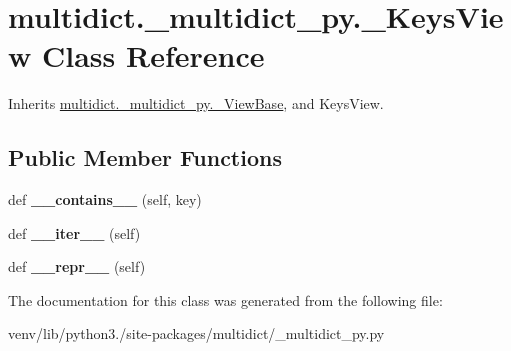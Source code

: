 \hypertarget{classmultidict_1_1__multidict__py_1_1___keys_view}{}\section{multidict.\+\_\+multidict\+\_\+py.\+\_\+\+Keys\+View Class Reference}
\label{classmultidict_1_1__multidict__py_1_1___keys_view}


Inherits \hyperlink{classmultidict_1_1__multidict__py_1_1___view_base}{multidict.\+\_\+multidict\+\_\+py.\+\_\+\+View\+Base}, and Keys\+View.

\subsection*{Public Member Functions}
\begin{DoxyCompactItemize}
\item 
\mbox{\label{classmultidict_1_1__multidict__py_1_1___keys_view_a842c7f3d59014e558d6e6088c561f066}} 
def {\bfseries \+\_\+\+\_\+contains\+\_\+\+\_\+} (self, key)
\item 
\mbox{\label{classmultidict_1_1__multidict__py_1_1___keys_view_ab89f0f0fa78c8f37ec67f86d9bc02b82}} 
def {\bfseries \+\_\+\+\_\+iter\+\_\+\+\_\+} (self)
\item 
\mbox{\label{classmultidict_1_1__multidict__py_1_1___keys_view_ae35ccaa52ed383205b7b0d69874bda2d}} 
def {\bfseries \+\_\+\+\_\+repr\+\_\+\+\_\+} (self)
\end{DoxyCompactItemize}


The documentation for this class was generated from the following file\+:\begin{DoxyCompactItemize}
\item 
venv/lib/python3./site-\/packages/multidict/\+\_\+multidict\+\_\+py.\+py\end{DoxyCompactItemize}
